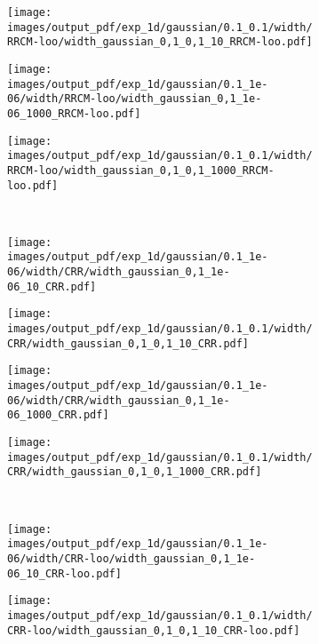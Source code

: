 \documentclass[a4paper,14pt]{extarticle}
\begin{document}
\begin{figure}
  \begin{subfigure}[b]{0.25\linewidth}
    \texttt{[image: images/output\_pdf/exp\_1d/gaussian/0.1\_0.1/width/RRCM-loo/width\_gaussian\_0,1\_0,1\_10\_RRCM-loo.pdf]}
  \end{subfigure}%
  \begin{subfigure}[b]{0.25\linewidth}
    \texttt{[image: images/output\_pdf/exp\_1d/gaussian/0.1\_1e-06/width/RRCM-loo/width\_gaussian\_0,1\_1e-06\_1000\_RRCM-loo.pdf]}
  \end{subfigure}%
  \begin{subfigure}[b]{0.25\linewidth}
    \texttt{[image: images/output\_pdf/exp\_1d/gaussian/0.1\_0.1/width/RRCM-loo/width\_gaussian\_0,1\_0,1\_1000\_RRCM-loo.pdf]}
  \end{subfigure}\\
  \begin{subfigure}[b]{0.25\linewidth}
    \texttt{[image: images/output\_pdf/exp\_1d/gaussian/0.1\_1e-06/width/CRR/width\_gaussian\_0,1\_1e-06\_10\_CRR.pdf]}
  \end{subfigure}%
  \begin{subfigure}[b]{0.25\linewidth}
    \texttt{[image: images/output\_pdf/exp\_1d/gaussian/0.1\_0.1/width/CRR/width\_gaussian\_0,1\_0,1\_10\_CRR.pdf]}
  \end{subfigure}%
  \begin{subfigure}[b]{0.25\linewidth}
    \texttt{[image: images/output\_pdf/exp\_1d/gaussian/0.1\_1e-06/width/CRR/width\_gaussian\_0,1\_1e-06\_1000\_CRR.pdf]}
  \end{subfigure}%
  \begin{subfigure}[b]{0.25\linewidth}
    \texttt{[image: images/output\_pdf/exp\_1d/gaussian/0.1\_0.1/width/CRR/width\_gaussian\_0,1\_0,1\_1000\_CRR.pdf]}
  \end{subfigure}\\
  \begin{subfigure}[b]{0.25\linewidth}
    \texttt{[image: images/output\_pdf/exp\_1d/gaussian/0.1\_1e-06/width/CRR-loo/width\_gaussian\_0,1\_1e-06\_10\_CRR-loo.pdf]}
    \caption{} \label{fig:gaussian_1d_high_noise_arb_width_c1}
  \end{subfigure}%
  \begin{subfigure}[b]{0.25\linewidth}
    \texttt{[image: images/output\_pdf/exp\_1d/gaussian/0.1\_0.1/width/CRR-loo/width\_gaussian\_0,1\_0,1\_10\_CRR-loo.pdf]}
    \caption{} \label{fig:gaussian_1d_high_noise_arb_width_c2}

\end{subfigure}
\end{figure}
\end{document}
